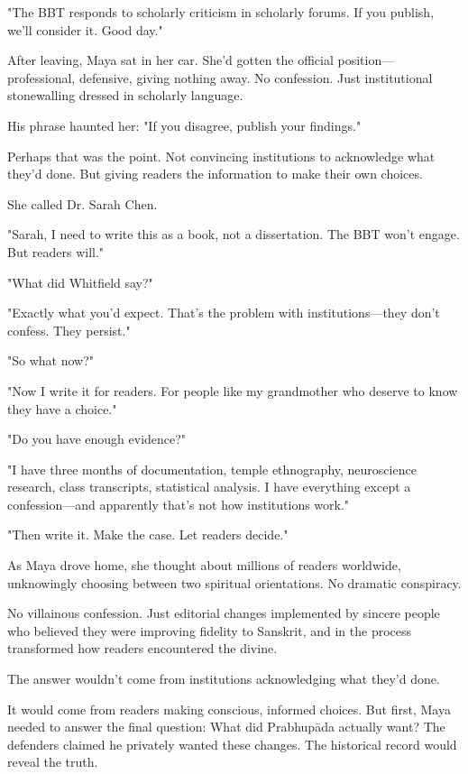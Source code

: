 \documentclass[12pt,twoside]{book}
\makeatletter
\def\cleardoublepage{\clearpage\if@twoside \ifodd\c@page\else\hbox{}\thispagestyle{empty}\newpage\if@twocolumn\hbox{}\newpage\fi\fi\fi}
\makeatother
\begin{document}
"The BBT responds to scholarly criticism in scholarly forums. If you publish, we'll consider it. Good day."

After leaving, Maya sat in her car. She'd gotten the official position—professional, defensive, giving nothing away. No confession. Just institutional stonewalling dressed in scholarly language.

His phrase haunted her: "If you disagree, publish your findings."

Perhaps that was the point. Not convincing institutions to acknowledge what they'd done. But giving readers the information to make their own choices.

She called Dr. Sarah Chen.

"Sarah, I need to write this as a book, not a dissertation. The BBT won't engage. But readers will."

"What did Whitfield say?"

"Exactly what you'd expect. That's the problem with institutions—they don't confess. They persist."

"So what now?"

"Now I write it for readers. For people like my grandmother who deserve to know they have a choice."

"Do you have enough evidence?"

"I have three months of documentation, temple ethnography, neuroscience research, class transcripts, statistical analysis. I have everything except a confession—and apparently that's not how institutions work."

"Then write it. Make the case. Let readers decide."

As Maya drove home, she thought about millions of readers worldwide, unknowingly choosing between two spiritual orientations. No dramatic conspiracy.

No villainous confession. Just editorial changes implemented by sincere people who believed they were improving fidelity to Sanskrit, and in the process transformed how readers encountered the divine.

The answer wouldn't come from institutions acknowledging what they'd done.

It would come from readers making conscious, informed choices. But first, Maya needed to answer the final question: What did Prabhupāda actually want? The defenders claimed he privately wanted these changes. The historical record would reveal the truth.

\cleardoublepage
\vspace*{0.20\textheight}
\end{document}
